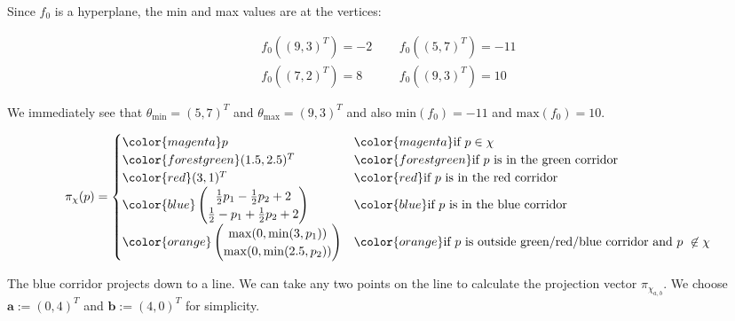 %
%
%
\begin{flushleft}
Since $f_0$ is a hyperplane, the min and max values are at the vertices:
\end{flushleft}
\begin{align*}
  f_0((9,3)^T) = -2 \;\;\;\;\;& f_0((5,7)^T) = -11 \\ f_0((7,2)^T) = 8 \;\;\;\;\;& f_0((9,3)^T) = 10
\end{align*}
\begin{flushleft}
  We immediately see that $\theta_\text{min} = (5,7)^T$ and $\theta_\text{max} = (9,3)^T$ and also $\mathrm{min}(f_0) = -11$ and $\mathrm{max}(f_0) = 10$.
\end{flushleft}
%
%
%
\begin{equation*}
  \pi_\chi(p) = 
  \begin{cases}
    {\color{magenta}p} & {\color{magenta}\text{if } p\in \chi} \\
    {\color{forestgreen}(1.5,2.5)^T} & {\color{forestgreen}\text{if $p$ is in the green corridor}} \\
    {\color{red}(3,1)^T} & {\color{red}\text{if $p$ is in the red corridor}} \\
    {\color{blue}\begin{pmatrix}
      \frac{1}{2} p_1 - \frac{1}{2} p_2 + 2 \\
      \frac{1}{2} - p_1 + \frac{1}{2} p_2 + 2 \\
    \end{pmatrix}} & {\color{blue}\text{if $p$ is in the blue corridor}} \\
    {\color{orange}\begin{pmatrix}
      \mathrm{max}(0, \mathrm{min}(3, p_1)) \\
      \mathrm{max}(0, \mathrm{min}(2.5, p_2))
    \end{pmatrix}} & {\color{orange}\text{if $p$ is outside green/red/blue corridor and } p \not\in \chi}
    \end{cases} 
\end{equation*}
\begin{flushleft}
The blue corridor projects down to a line. We can take any two points on the line to calculate the projection vector $\pi_{\chi_{a,b}}$. We choose $\mathbf{a}:=(0,4)^T$ and $\mathbf{b}:=(4,0)^T$ for simplicity.
\end{flushleft}
